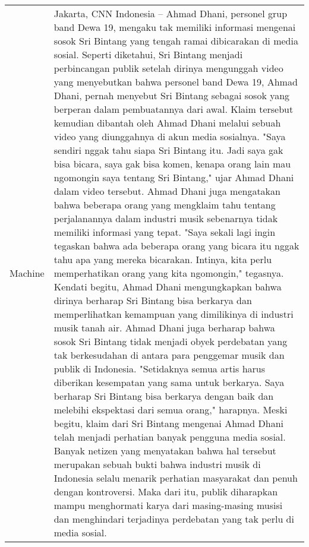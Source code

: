 \begin{center}
\begin{supertabular}{l | p{12cm}}
        \midrule
        Machine & Jakarta, CNN Indonesia -- Ahmad Dhani, personel grup band Dewa 19, mengaku tak memiliki informasi mengenai sosok Sri Bintang yang tengah ramai dibicarakan di media sosial. Seperti diketahui, Sri Bintang menjadi perbincangan publik setelah dirinya mengunggah video yang menyebutkan bahwa personel band Dewa 19, Ahmad Dhani, pernah menyebut Sri Bintang sebagai sosok yang berperan dalam pembuatannya dari awal. Klaim tersebut kemudian dibantah oleh Ahmad Dhani melalui sebuah video yang diunggahnya di akun media sosialnya. "Saya sendiri nggak tahu siapa Sri Bintang itu. Jadi saya gak bisa bicara, saya gak bisa komen, kenapa orang lain mau ngomongin saya tentang Sri Bintang," ujar Ahmad Dhani dalam video tersebut. Ahmad Dhani juga mengatakan bahwa beberapa orang yang mengklaim tahu tentang perjalanannya dalam industri musik sebenarnya tidak memiliki informasi yang tepat. "Saya sekali lagi ingin tegaskan bahwa ada beberapa orang yang bicara itu nggak tahu apa yang mereka bicarakan. Intinya, kita perlu memperhatikan orang yang kita ngomongin," tegasnya. Kendati begitu, Ahmad Dhani mengungkapkan bahwa dirinya berharap Sri Bintang bisa berkarya dan memperlihatkan kemampuan yang dimilikinya di industri musik tanah air. Ahmad Dhani juga berharap bahwa sosok Sri Bintang tidak menjadi obyek perdebatan yang tak berkesudahan di antara para penggemar musik dan publik di Indonesia. "Setidaknya semua artis harus diberikan kesempatan yang sama untuk berkarya. Saya berharap Sri Bintang bisa berkarya dengan baik dan melebihi ekspektasi dari semua orang," harapnya. Meski begitu, klaim dari Sri Bintang mengenai Ahmad Dhani telah menjadi perhatian banyak pengguna media sosial. Banyak netizen yang menyatakan bahwa hal tersebut merupakan sebuah bukti bahwa industri musik di Indonesia selalu menarik perhatian masyarakat dan penuh dengan kontroversi. Maka dari itu, publik diharapkan mampu menghormati karya dari masing-masing musisi dan menghindari terjadinya perdebatan yang tak perlu di media sosial.\\
       

\end{supertabular}
\end{center}
